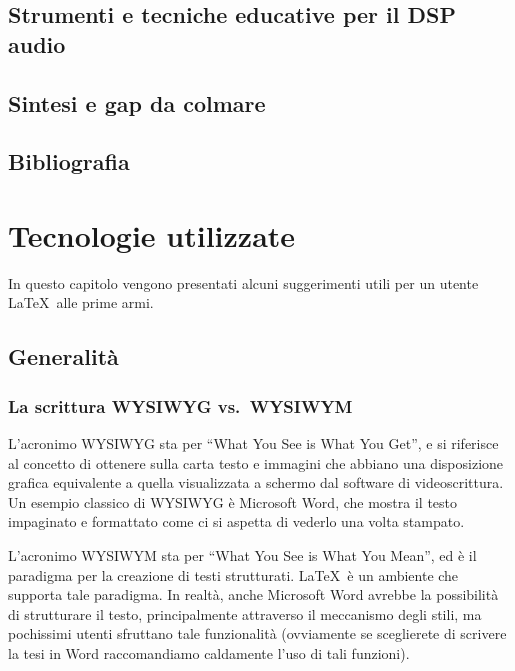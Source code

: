 \documentclass[12pt]{report}
\begin{document}
\section{Strumenti e tecniche educative per il DSP audio}

\section{Sintesi e gap da colmare}

\section{Bibliografia}
\printbibliography


%
%

\chapter{Tecnologie utilizzate}
\label{cap3}

In questo capitolo vengono presentati alcuni suggerimenti utili per un utente \LaTeX\ alle prime armi.


\section{Generalit\`a}

\subsection{La scrittura WYSIWYG vs.\ WYSIWYM}

L'acronimo WYSIWYG sta per ``What You See is What You Get'', e si riferisce al concetto di ottenere sulla carta testo e immagini che abbiano una disposizione grafica equivalente a quella visualizzata a schermo dal software di videoscrittura. Un esempio classico di WYSIWYG è Microsoft Word, che mostra il testo impaginato e formattato come ci si aspetta di vederlo una volta stampato.

L'acronimo WYSIWYM sta per ``What You See is What You Mean'', ed è il paradigma per la creazione di testi strutturati. \LaTeX\ è un ambiente che supporta tale paradigma. In realtà, anche Microsoft Word avrebbe la possibilità di strutturare il testo, principalmente attraverso il meccanismo degli stili, ma pochissimi utenti sfruttano tale funzionalità (ovviamente se sceglierete di scrivere la tesi in Word raccomandiamo caldamente l'uso di tali funzioni).
\end{document}
